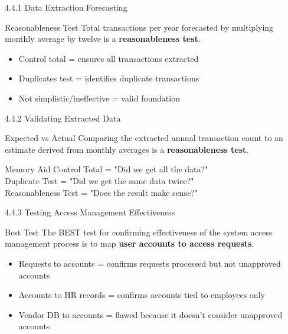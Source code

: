 \documentclass{beamer}
\begin{document}
	\begin{frame}{4.4.1 Data Extraction Forecasting}
		\begin{block}{Reasonableness Test}
			Total transactions per year forecasted by multiplying monthly average by twelve is a \textbf{reasonableness test}.
		\end{block}
		\begin{itemize}
			\item Control total = ensures all transactions extracted
			\item Duplicates test = identifies duplicate transactions
			\item Not simplistic/ineffective = valid foundation
		\end{itemize}
	\end{frame}
	
	\begin{frame}{4.4.2 Validating Extracted Data}
		\begin{block}{Expected vs Actual}
			Comparing the extracted annual transaction count to an estimate derived from monthly averages is a \textbf{reasonableness test}.
		\end{block}
		\begin{exampleblock}{Memory Aid}
			Control Total = "Did we get all the data?" \\
			Duplicate Test = "Did we get the same data twice?" \\
			Reasonableness Test = "Does the result make sense?"
		\end{exampleblock}
	\end{frame}
	
	\begin{frame}{4.4.3 Testing Access Management Effectiveness}
		\begin{block}{Best Test}
			The BEST test for confirming effectiveness of the system access management process is to map \textbf{user accounts to access requests}.
		\end{block}
		\begin{itemize}
			\item Requests to accounts = confirms requests processed but not unapproved accounts
			\item Accounts to HR records = confirms accounts tied to employees only
			\item Vendor DB to accounts = flawed because it doesn't consider unapproved accounts
		\end{itemize}
	\end{frame}
	
\end{document}
